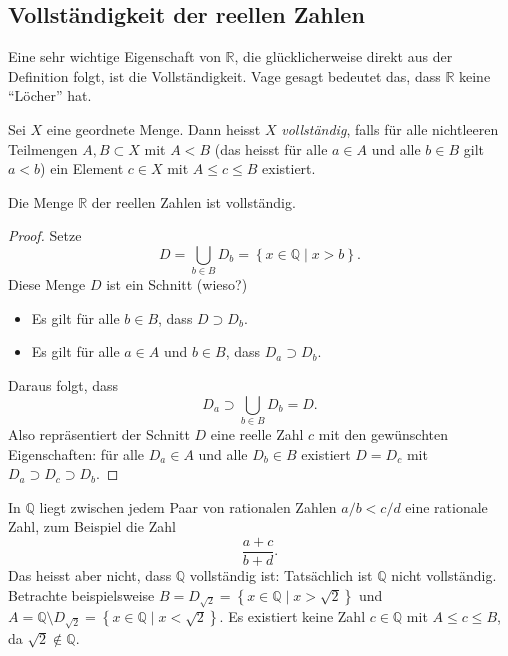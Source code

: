 \documentclass[../main.tex]{subfiles}
\begin{document}
\subsection*{Vollständigkeit der reellen Zahlen}
Eine sehr wichtige Eigenschaft von $\mathbb{R}$, die
glücklicherweise direkt aus der Definition folgt,
ist die Vollständigkeit. Vage gesagt bedeutet das,
dass $\mathbb{R}$ keine ``Löcher'' hat.

\begin{definition}
	Sei $X$ 
	eine geordnete Menge. Dann heisst $X$ \textit{vollständig},
	falls für alle nichtleeren Teilmengen $A, B \subset X$
	mit $A < B$ (das heisst für alle $a \in A$ und alle $b \in B$
	gilt $a < b$) ein Element $c \in X$ mit $A \leq c \leq B$
	existiert.
\end{definition}

\begin{claim}
	Die Menge $\mathbb{R}$ der reellen Zahlen ist vollständig.
\end{claim}

\begin{proof}
  Setze
  \[
    D = \bigcup_{b \in B} D_b = \left\{x \in \mathbb{Q} \mid x > b\right\}.
  \]
  Diese Menge $D$ ist ein Schnitt (wieso?) %
  \begin{itemize}
	  \item Es gilt für alle $b \in B$, dass $D \supset D_b$.
	  \item Es gilt für alle $a \in A$ und $b \in B$, dass
		  $D_a \supset D_b$.
  \end{itemize}
  Daraus folgt, dass 
	\[
	   D_a 
	   \supset 
	   \bigcup_{b \in B} D_b = D.
	\]
  Also repräsentiert der Schnitt $D$ eine reelle Zahl $c$
  mit den gewünschten Eigenschaften: für alle
  $D_a \in A$ und alle $D_b \in B$ existiert $D = D_c$
  mit $D_a \supset D_c \supset D_b$.
\end{proof}

\begin{remark}
  In $\mathbb Q$ liegt zwischen jedem Paar von rationalen Zahlen
  $a/b < c/d$ eine rationale Zahl, zum Beispiel die Zahl
  \[
    \frac{a+c}{b+d}.
  \]
  Das heisst aber nicht, dass $\mathbb Q$ vollständig ist:
  Tatsächlich ist $\mathbb{Q}$ nicht vollständig. Betrachte
  beispielsweise 
  $B= D_{\sqrt 2} = \left\{x \in \mathbb{Q} \mid x > \sqrt 2 \right\}$
  und $A = \mathbb{Q} \setminus D_{\sqrt 2}
  = \left\{x \in \mathbb{Q} \mid x < \sqrt 2\right\}$.
  Es existiert keine Zahl $c \in \mathbb{Q}$ mit $A \leq c \leq B$,
  da $\sqrt 2 \notin \mathbb{Q}$.
\end{remark}
\end{document}
